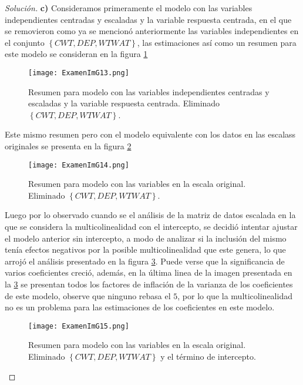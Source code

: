 \documentclass[10.5pt,notitlepage]{article}
\newenvironment{solucion}
  {\begin{proof}[Solución]}
  {\end{proof}}
\newcommand{\kis}[1]{\left\{ #1 \right\}}
\theoremstyle{plain}
\begin{document}
\begin{solucion}
\noindent \textbf{c)} Consideramos primeramente el modelo con las variables independientes centradas y escaladas y la variable respuesta centrada, en el que se removieron como ya se mencionó anteriormente las variables independientes en el conjunto \(\kis{CWT,DEP, WTWAT}\), las estimaciones así como un resumen para este modelo se consideran en la figura \ref{fig55}
\begin{figure}[htb]
 \centering
 \texttt{[image: ExamenImG13.png]}
 \caption{Resumen para modelo con las variables independientes centradas y escaladas y la variable respuesta centrada. Eliminado \(\kis{CWT,DEP, WTWAT}\).}
\label{fig55}
\end{figure}
Este mismo resumen pero con el modelo equivalente con los datos en las escalass originales se presenta en la figura \ref{fig66}
\begin{figure}[htb]
 \centering
 \texttt{[image: ExamenImG14.png]}
 \caption{Resumen para modelo con las variables en la escala original. Eliminado \(\kis{CWT,DEP, WTWAT}\).}
\label{fig66}
\end{figure}
Luego por lo observado cuando se el análisis de la matriz de datos escalada en la que se considera la multicolinealidad con el intercepto, se decidió intentar ajustar el modelo anterior sin intercepto, a modo de analizar si la inclusión del mismo tenía efectos negativos por la posible multicolinealidad que este genera, lo que arrojó el análisis presentado en la figura \ref{fig77}. Puede verse que la significancia de varios coeficientes creció, además, en la última linea de la imagen presentada en la \ref{fig77} se presentan todos los factores de inflación de la varianza de los coeficientes de este modelo, observe que ninguno rebasa el \(5\), por lo que la multicolinealidad no es un problema para las estimaciones de los coeficientes en este modelo.
\begin{figure}[htb]
 \centering
 \texttt{[image: ExamenImG15.png]}
 \caption{Resumen para modelo con las variables en la escala original. Eliminado \(\kis{CWT,DEP, WTWAT}\) y el término de intercepto.}
\label{fig77}
\end{figure}


\end{solucion}
\end{document}
